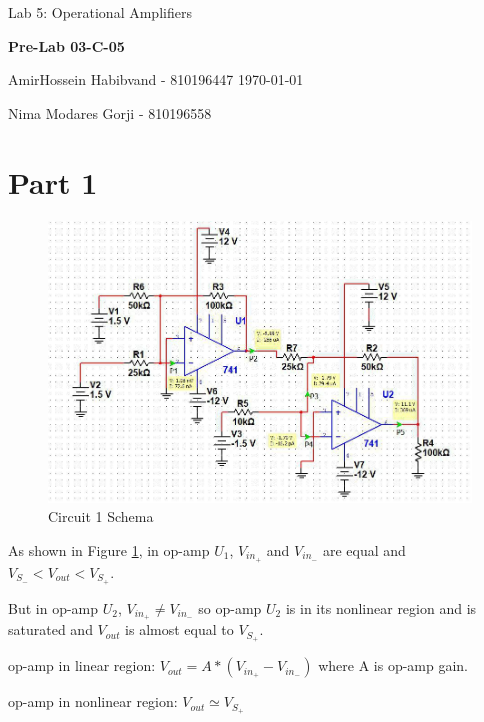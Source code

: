 \documentclass[a4paper,twoside]{report}
\begin{document}
    {\large Lab 5: Operational Amplifiers }
    \hfill
    {\large \textbf{Pre-Lab 03-C-05} \par}
	\vspace{0.1in}
    {\large AmirHossein Habibvand - 810196447}
    \hfill
    \today \par
    {\large Nima Modares Gorji - 810196558 \par}
	\vspace{0.5in}

    \section*{Part 1}
    {
        \begin{figure}[!h]
            \includegraphics[width=\linewidth]{part1.jpg}
            \caption{Circuit 1 Schema}
            \label{fig:part1}
        \end{figure}

        As shown in Figure \ref{fig:part1}, in op-amp $U_1$, $V_{in_+}$ and $V_{in_-}$ are equal and $V_{S_-} < V_{out} < V_{S_+}$.

        But in op-amp $U_2$, $V_{in_+} \neq V_{in_-}$ so op-amp $U_2$ is in its nonlinear region and is saturated and $V_{out}$ is almost equal to $V_{S_+}$.

        op-amp in linear region: $V_{out} = A * (V_{in_+} - V_{in_-})$ where A is op-amp gain.

        op-amp in nonlinear region: $V_{out} \simeq V_{S_+}$
    }

    \newpage
\end{document}

